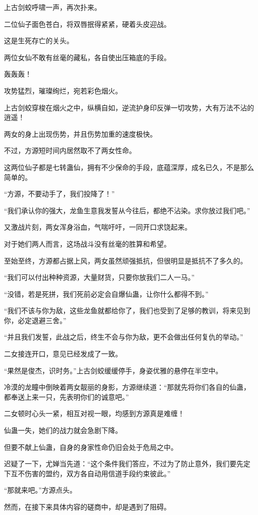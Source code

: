 \begin{this_body}
上古剑蛟呼啸一声，再次扑来。

二位仙子面色苍白，将双唇抿得紧紧，硬着头皮迎战。

这是生死存亡的关头。

两位女仙不敢有丝毫的藏私，各自使出压箱底的手段。

轰轰轰！

攻势猛烈，璀璨绚烂，宛若彩色烟火。

上古剑蛟穿梭在烟火之中，纵横自如，逆流护身印反弹一切攻势，大有万法不沾的逍遥！

两女的身上出现伤势，并且伤势加重的速度极快。

不过，方源短时间内居然取不了两女性命。

这两位仙子都是七转蛊仙，拥有不少保命的手段，底蕴深厚，成名已久，不是那么简单的。

“方源，不要动手了，我们投降了！”

“我们承认你的强大，龙鱼生意我发誓从今往后，都绝不沾染。求你放过我们吧。”

又激战片刻，两女浑身浴血，气喘吁吁，一同开口求饶起来。

对于她们两人而言，这场战斗没有丝毫的胜算和希望。

至始至终，方源都占据上风，两女虽然顽强抵抗，但很明显是抵抗不了多久的。

“我们可以付出种种资源，大量财货，只要你放我们二人一马。”

“没错，若是死拼，我们死前必定会自爆仙蛊，让你什么都得不到。”

“我们不该与你为敌，这些龙鱼就都给你了，我们也受到了足够的教训，将来见到你，必定退避三舍。”

“并且我们发誓，此战之后，终生不会与你为敌，更不会做出任何复仇的举动。”

二女接连开口，意见已经发成了一致。

“果然是俊杰，识时务。”上古剑蛟缓缓停手，身姿优雅的悬停在半空中。

冷漠的龙瞳中倒映着两女靓丽的身影，方源继续道：“那就先将你们各自的仙蛊，都奉送上来一只，先表明你们的诚意吧。”

二女顿时心头一紧，相互对视一眼，均感到方源真是难缠！

仙蛊一失，她们的战力就会急剧下降。

但要不献上仙蛊，自身的身家性命仍旧会处于危局之中。

迟疑了一下，尤婵当先道：“这个条件我们答应，不过为了防止意外，我们要先定下互不伤害的盟约，双方各自动用信道手段约束彼此。”

“那就来吧。”方源点头。

然而，在接下来具体内容的磋商中，却是遇到了阻碍。


\end{this_body}
